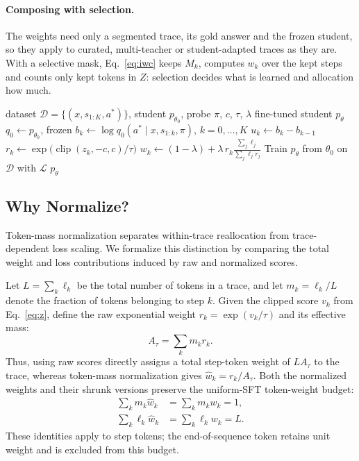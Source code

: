 \paragraph{Composing with selection.}
\label{sec:compose}
The weights need only a segmented trace, its gold answer and the frozen student, so they apply to curated, multi-teacher or student-adapted traces as they are. With a selective mask, Eq.~\ref{eq:iwc} keeps $M_k$, computes $w_k$ over the kept steps and counts only kept tokens in $Z$: selection decides what is learned and allocation how much.

\begin{algorithm}[t]
\caption{Answer-gain allocation}
\label{alg:alg}
\small
\begin{algorithmic}[1]
\Require dataset $\mathcal{D}=\{(x,s_{1:K},a^*)\}$, student $p_{\theta_0}$, probe $\pi$, $c$, $\tau$, $\lambda$
\Ensure fine-tuned student $p_\theta$
\State $q_0\gets p_{\theta_0}$, frozen
 
  \State $b_k\gets\log q_0(a^*\mid x,s_{1:k},\pi)$, $k=0,\dots,K$
  \State $u_k\gets b_k-b_{k-1}$ 
  \State $r_k\gets\exp\!\big(\operatorname{clip}(z_k,-c,c)/\tau\big)$ 
  \State $w_k\gets(1-\lambda)+\lambda\, r_k\frac{\sum_j\ell_j}{\sum_j\ell_jr_j}$ 
\EndFor
\State Train $p_\theta$ from $\theta_0$ on $\mathcal{D}$ with $\mathcal{L}$ 
\State \Return $p_\theta$
\end{algorithmic}
\end{algorithm}


\subsection{Why Normalize?}
\label{sec:why-norm}

Token-mass normalization separates within-trace
reallocation from trace-dependent loss scaling. We
formalize this distinction by comparing the total
weight and loss contributions induced by raw and
normalized scores.

Let $L=\sum_k\ell_k$ be the total number of tokens in
a trace, and let $m_k=\ell_k/L$ denote the fraction of
tokens belonging to step $k$. Given the clipped score
$v_k$ from Eq.~\ref{eq:z}, define the raw exponential
weight $r_k=\exp(v_k/\tau)$ and its effective mass:
\begin{equation}
A_\tau=\sum_km_kr_k.
\label{eq:effective-mass}
\end{equation}
Thus, using raw scores directly assigns a total
step-token weight of $LA_\tau$ to the trace, whereas
token-mass normalization gives $\hat w_k=r_k/A_\tau$.
Both the normalized weights and their shrunk versions
preserve the uniform-SFT token-weight budget:
\begin{equation}
\begin{aligned}
\sum_km_k\hat w_k&=\sum_km_kw_k=1, \\
\sum_k\ell_k\hat w_k&=\sum_k\ell_kw_k=L.
\end{aligned}
\label{eq:mass-summary}
\end{equation}
These identities apply to step tokens; the end-of-sequence
token retains unit weight and is excluded from this budget.

